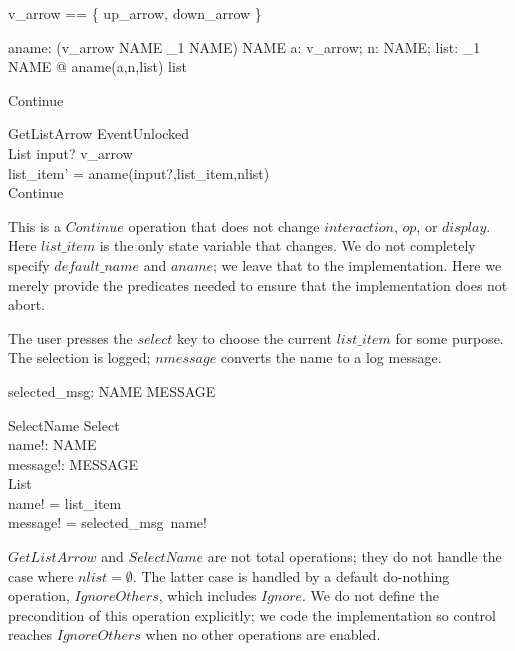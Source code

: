 \begin{zed} v\_arrow == \{ up\_arrow, down\_arrow \} \end{zed}

\begin{axdef}
	aname: (v\_arrow \cross NAME \cross \power_1 NAME) \fun NAME 
\where
	\forall a: v\_arrow; n: NAME; list: \power_1 NAME @ aname(a,n,list) \in list
\end{axdef}

\begin{zed}
Continue 
\end{zed}
\begin{schema}{GetListArrow}
	EventUnlocked \\
	\Delta List
\where
	input? \in v\_arrow \\
	list\_item' = aname(input?,list\_item,nlist) \\
	Continue \\
\end{schema}
This is a $Continue$ operation that does not change $interaction$,
$op$, or $display$.  Here $list\_item$ is the only state variable that
changes.  We do not completely specify $default\_name$ and $aname$; we
leave that to the implementation.  Here we merely provide the
predicates needed to ensure that the implementation does not abort.

The user presses the $select$ key to choose the current $list\_item$
for some purpose.  The selection is logged; $nmessage$ converts the
name to a log message.

\begin{axdef}
	selected\_msg: NAME \fun MESSAGE
\end{axdef}

\begin{schema}{SelectName}
	Select \\
	name!: NAME \\
	message!: MESSAGE \\
\where
	List \\
	name! = list\_item \\
	message! = selected\_msg~name!
\end{schema}
$GetListArrow$ and $SelectName$ are not total operations; they do not
handle the case where $nlist = \emptyset$.  The latter case is handled
by a default do-nothing operation, $IgnoreOthers$, which includes
$Ignore$.  We do not define the precondition of this operation
explicitly; we code the implementation so control reaches
$IgnoreOthers$ when no other operations are enabled.


